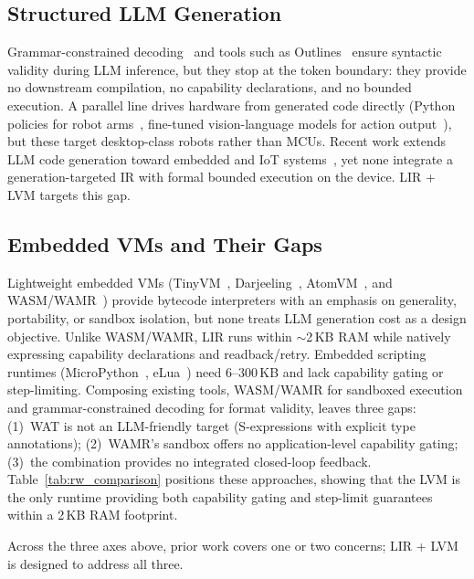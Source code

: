 \documentclass[a4paper,fleqn,longmktitle]{cas-dc}
\begin{document}
\subsection{Structured LLM Generation}
\label{sec:bg_gen}

Grammar-constrained decoding~\citep{willard2023structured} and tools such as Outlines~\citep{outlines} ensure syntactic validity during LLM inference, but they stop at the token boundary: they provide no downstream compilation, no capability declarations, and no bounded execution. A parallel line drives hardware from generated code directly (Python policies for robot arms~\citep{liang2023code}, fine-tuned vision-language models for action output~\citep{brohan2023rt2,openvla}), but these target desktop-class robots rather than MCUs. Recent work extends LLM code generation toward embedded and IoT systems~\citep{esposito2024llm_embedded,liu2023llm4hw}, yet none integrate a generation-targeted IR with formal bounded execution on the device. LIR + LVM targets this gap.

\subsection{Embedded VMs and Their Gaps}
\label{sec:bg_vm}

Lightweight embedded VMs (TinyVM~\citep{tinyvm}, Darjeeling~\citep{darjeeling}, AtomVM~\citep{atomvm}, and WASM/WAMR~\citep{wamr}) provide bytecode interpreters with an emphasis on generality, portability, or sandbox isolation, but none treats LLM generation cost as a design objective. Unlike WASM/WAMR, LIR runs within $\sim$2\,KB RAM while natively expressing capability declarations and readback/retry. Embedded scripting runtimes (MicroPython~\citep{micropython}, eLua~\citep{lua}) need 6--300\,KB and lack capability gating or step-limiting. Composing existing tools, WASM/WAMR for sandboxed execution and grammar-constrained decoding for format validity, leaves three gaps: (1)~WAT is not an LLM-friendly target (S-expressions with explicit type annotations); (2)~WAMR's sandbox offers no application-level capability gating; (3)~the combination provides no integrated closed-loop feedback. Table~\ref{tab:rw_comparison} positions these approaches, showing that the LVM is the only runtime providing both capability gating and step-limit guarantees within a 2\,KB RAM footprint.

Across the three axes above, prior work covers one or two concerns; LIR + LVM is designed to address all three.
\end{document}
